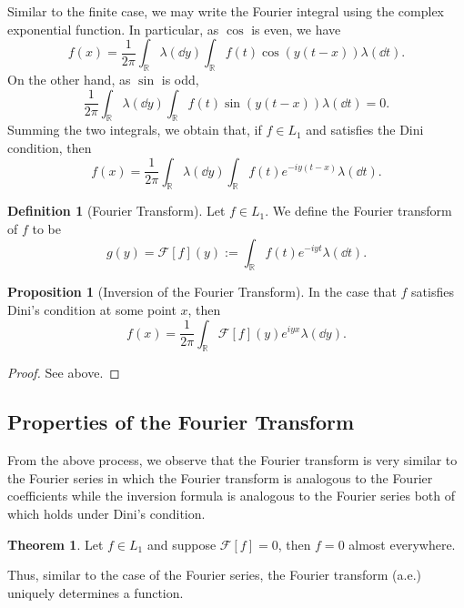 \documentclass[]{article}
\theoremstyle{definition}
\newtheorem{theorem}{Theorem}
\theoremstyle{definition}
\newtheorem{definition}{Definition}[section]
\newtheorem{proposition}{Proposition}[section]
\begin{document}
Similar to the finite case, we may write the Fourier integral using the complex exponential
function. In particular, as \(\cos\) is even, we have 
\[f(x) = \frac{1}{2\pi} \int_{\mathbb{R}} \lambda(\dd y) \int_{\mathbb{R}} f(t) \cos(y(t - x)) \lambda(\dd t).\]
On the other hand, as \(\sin\) is odd,
\[\frac{1}{2\pi} \int_{\mathbb{R}} \lambda(\dd y) \int_{\mathbb{R}} f(t) \sin(y(t - x)) \lambda(\dd t) = 0.\]
Summing the two integrals, we obtain that, if \(f \in L_1\) and satisfies the 
Dini condition, then 
\[f(x) = \frac{1}{2\pi} \int_{\mathbb{R}} \lambda(\dd y)\int_{\mathbb{R}}f(t) e^{-iy(t - x)} \lambda(\dd t).\]

\begin{definition}[Fourier Transform]
  Let \(f \in L_1\). We define the Fourier transform of \(f\) to be 
  \[g(y) = \mathcal{F}[f](y) := \int_{\mathbb{R}}f(t) e^{-iyt} \lambda(\dd t).\]
\end{definition}

\begin{proposition}[Inversion of the Fourier Transform]
  In the case that \(f\) satisfies Dini's condition at some point \(x\), then 
  \[f(x) = \frac{1}{2\pi} \int_{\mathbb{R}} \mathcal{F}[f](y) e^{iyx} \lambda(\dd y).\]
\end{proposition}
\begin{proof}
  See above.
\end{proof}

\subsection{Properties of the Fourier Transform}

From the above process, we observe that the Fourier transform is very similar to 
the Fourier series in which the Fourier transform is analogous to the Fourier 
coefficients while the inversion formula is analogous to the Fourier series 
both of which holds under Dini's condition.

\begin{theorem}
  Let \(f \in L_1\) and suppose \(\mathcal{F}[f] = 0\), then \(f = 0\) almost everywhere.
\end{theorem}
Thus, similar to the case of the Fourier series, the Fourier transform (a.e.) uniquely 
determines a function.
\end{document}
